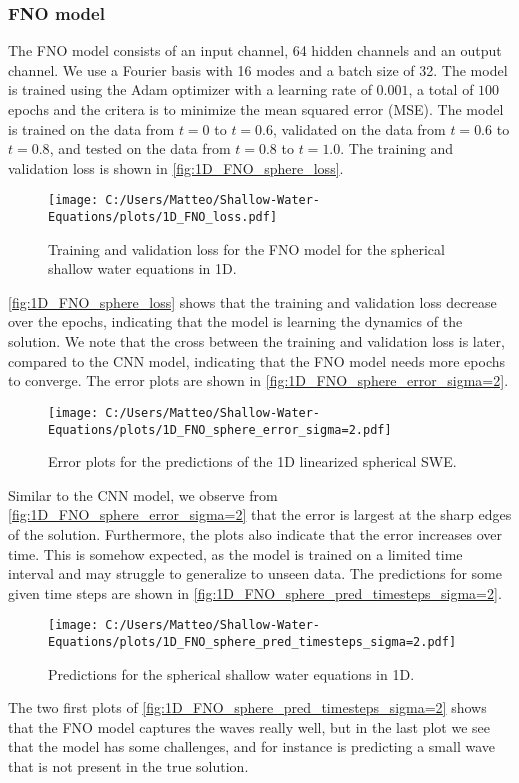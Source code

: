 \subsubsection*{FNO model}
The FNO model consists of an input channel, 64 hidden channels and an output channel. We use a Fourier basis with 16 modes and a batch size of 32.
The model is trained using the Adam optimizer with a learning rate of $0.001$, a total of $100$ epochs and the critera is to minimize the mean squared error (MSE).
The model is trained on the data from $t = 0$ to $t = 0.6$, validated on the data from $t = 0.6$ to $t = 0.8$, and tested on the data from $t = 0.8$ to $t = 1.0$.
The training and validation loss is shown in \autoref{fig:1D_FNO_sphere_loss}.
\begin{figure}[H]
    \centering
    \texttt{[image: C:/Users/Matteo/Shallow-Water-Equations/plots/1D\_FNO\_loss.pdf]}
    \caption{Training and validation loss for the FNO model for the spherical shallow water equations in 1D.}\label{fig:1D_FNO_sphere_loss}
\end{figure}
\autoref{fig:1D_FNO_sphere_loss} shows that the training and validation loss decrease over the epochs, indicating that the model is learning the dynamics of the solution.
We note that the cross between the training and validation loss is later, compared to the CNN model, indicating that the FNO model needs more epochs to converge.
The error plots are shown in \autoref{fig:1D_FNO_sphere_error_sigma=2}.
\begin{figure}[H]
    \centering
    \texttt{[image: C:/Users/Matteo/Shallow-Water-Equations/plots/1D\_FNO\_sphere\_error\_sigma=2.pdf]}
    \caption{Error plots for the predictions of the 1D linearized spherical SWE.}\label{fig:1D_FNO_sphere_error_sigma=2}
\end{figure}
Similar to the CNN model, we observe from \autoref{fig:1D_FNO_sphere_error_sigma=2} that the error is largest at the sharp edges of the solution.
Furthermore, the plots also indicate that the error increases over time.
This is somehow expected, as the model is trained on a limited time interval and may struggle to generalize to unseen data.
The predictions for some given time steps are shown in \autoref{fig:1D_FNO_sphere_pred_timesteps_sigma=2}.
\begin{figure}[H]
    \centering
    \texttt{[image: C:/Users/Matteo/Shallow-Water-Equations/plots/1D\_FNO\_sphere\_pred\_timesteps\_sigma=2.pdf]}
    \caption{Predictions for the spherical shallow water equations in 1D.}\label{fig:1D_FNO_sphere_pred_timesteps_sigma=2}
\end{figure}
The two first plots of \autoref{fig:1D_FNO_sphere_pred_timesteps_sigma=2} shows that the FNO model captures the waves really well, but in the last plot we see that the model has some challenges, and for instance is predicting a small wave that is not present in the true solution.

